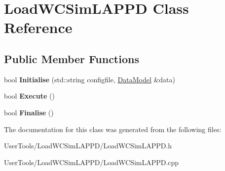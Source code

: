 \hypertarget{classLoadWCSimLAPPD}{
\section{LoadWCSimLAPPD Class Reference}
\label{classLoadWCSimLAPPD}
}
\subsection*{Public Member Functions}
\begin{DoxyCompactItemize}
\item 
\hypertarget{classLoadWCSimLAPPD_a1d2069798a83e0f34f41c4112b2343e8}{
bool {\bfseries Initialise} (std::string configfile, \hyperlink{classDataModel}{DataModel} \&data)}
\label{classLoadWCSimLAPPD_a1d2069798a83e0f34f41c4112b2343e8}

\item 
\hypertarget{classLoadWCSimLAPPD_a1b41167086f669fc1a71854a360406da}{
bool {\bfseries Execute} ()}
\label{classLoadWCSimLAPPD_a1b41167086f669fc1a71854a360406da}

\item 
\hypertarget{classLoadWCSimLAPPD_a457044289ecb5a3d18eeb6e8110a3902}{
bool {\bfseries Finalise} ()}
\label{classLoadWCSimLAPPD_a457044289ecb5a3d18eeb6e8110a3902}

\end{DoxyCompactItemize}


The documentation for this class was generated from the following files:\begin{DoxyCompactItemize}
\item 
UserTools/LoadWCSimLAPPD/LoadWCSimLAPPD.h\item 
UserTools/LoadWCSimLAPPD/LoadWCSimLAPPD.cpp\end{DoxyCompactItemize}
